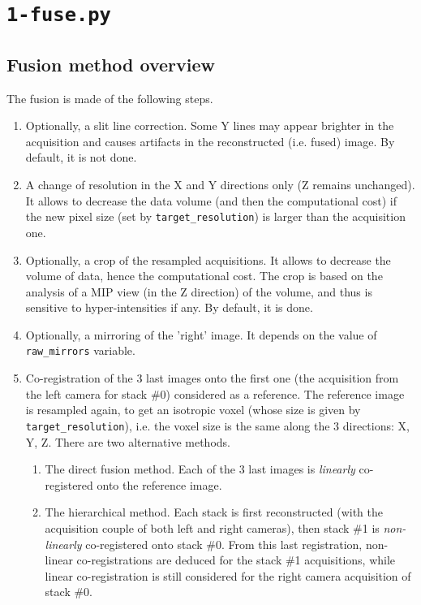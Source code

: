 \section{\texttt{1-fuse.py}}
\label{sec:cli:fuse}

\subsection{Fusion method overview}

The fusion is made of the following steps.
\begin{enumerate}
\itemsep -0.5ex
\item \label{it:fusion:slit:line} Optionally, a slit line correction. Some Y lines may appear brighter in the acquisition and causes artifacts in the reconstructed (i.e. fused) image. By default, it is not done.

\item A change of resolution in the X and Y directions only (Z remains unchanged). It allows to decrease the data volume (and then the computational cost) if the new pixel size (set by \verb|target_resolution|) is larger than the acquisition one.

\item \label{it:fusion:crop:1} Optionally, a crop of the resampled acquisitions. It allows to decrease the volume of data, hence the computational cost. The crop is based on the analysis of a MIP view (in the Z direction) of  the volume, and thus is sensitive to hyper-intensities if any. By default, it is done.

\item Optionally, a mirroring of the 'right' image. It depends on the value of  \verb|raw_mirrors| variable.

\item \label{it:fusion:registration} Co-registration of the 3 last images onto the first one (the acquisition from the left camera for stack \#0) considered as a reference. The reference image is resampled again, to get an isotropic voxel (whose size is given by \verb|target_resolution|), i.e. the voxel size is the same along the 3 directions: X, Y, Z. There are two alternative methods.
\begin{enumerate}
\itemsep -0.5ex
\item The direct fusion method. Each of the  3 last images is \textit{linearly} co-registered onto the reference image.
\item The hierarchical method. Each stack is first reconstructed (with the acquisition couple of both left and right cameras), then stack \#1 is \textit{non-linearly} co-registered onto stack \#0. From this last registration, non-linear co-registrations are deduced for the stack \#1 acquisitions, while linear co-registration is still considered for the right camera acquisition of stack \#0.
\end{enumerate}


\end{enumerate}
